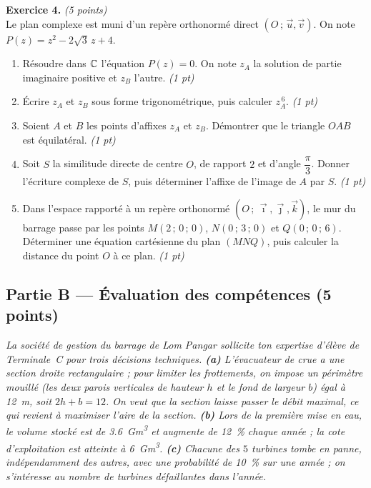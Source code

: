 \smallskip
\noindent\textbf{Exercice 4.} \hfill\textit{(5 points)}\\
Le plan complexe est muni d'un repère orthonormé direct $(O\,;\,\vec u,\vec v)$. On note
$P(z)=z^2-2\sqrt3\,z+4$.
\begin{enumerate}[label=\arabic*)]
\item Résoudre dans $\mathbb{C}$ l'équation $P(z)=0$. On note $z_A$ la solution de partie imaginaire positive
et $z_B$ l'autre. \hfill\textit{(1 pt)}
\item Écrire $z_A$ et $z_B$ sous forme trigonométrique, puis calculer $z_A^{\,6}$. \hfill\textit{(1 pt)}
\item Soient $A$ et $B$ les points d'affixes $z_A$ et $z_B$. Démontrer que le triangle $OAB$ est
équilatéral. \hfill\textit{(1 pt)}
\item Soit $S$ la similitude directe de centre $O$, de rapport $2$ et d'angle $\dfrac\pi3$. Donner
l'écriture complexe de $S$, puis déterminer l'affixe de l'image de $A$ par $S$. \hfill\textit{(1 pt)}
\item Dans l'espace rapporté à un repère orthonormé $(O\,;\,\vec\imath,\vec\jmath,\vec k)$, le mur du
barrage passe par les points $M(2\,;\,0\,;\,0)$, $N(0\,;\,3\,;\,0)$ et $Q(0\,;\,0\,;\,6)$. Déterminer
une équation cartésienne du plan $(MNQ)$, puis calculer la distance du point $O$ à ce plan. \hfill\textit{(1 pt)}
\end{enumerate}

\subsection*{Partie B — Évaluation des compétences \hfill (5 points)}

\noindent\textit{La société de gestion du barrage de Lom Pangar sollicite ton expertise d'élève de
Terminale~C pour trois décisions techniques. \textbf{(a)} L'évacuateur de crue a une section droite
rectangulaire ; pour limiter les frottements, on impose un périmètre mouillé (les deux parois
verticales de hauteur $h$ et le fond de largeur $b$) égal à \SI{12}{\metre}, soit $2h+b=12$. On veut
que la section laisse passer le débit maximal, ce qui revient à maximiser l'aire de la section.
\textbf{(b)} Lors de la première mise en eau, le volume stocké est de \SI{3,6}{\giga\metre\cubed} et
augmente de \SI{12}{\percent} chaque année ; la cote d'exploitation est atteinte à
\SI{6}{\giga\metre\cubed}. \textbf{(c)} Chacune des $5$ turbines tombe en panne, indépendamment des
autres, avec une probabilité de \SI{10}{\percent} sur une année ; on s'intéresse au nombre de
turbines défaillantes dans l'année.}

